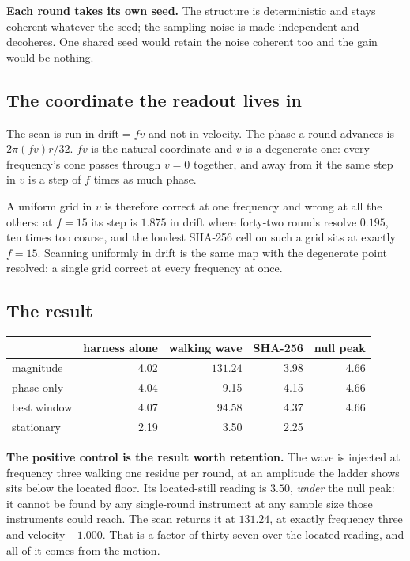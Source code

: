 \textbf{Each round takes its own seed.} The structure is deterministic and stays coherent whatever
the seed; the sampling noise is made independent and decoheres. One shared seed would retain the
noise coherent too and the gain would be nothing.

\subsection{The coordinate the readout lives in}

The scan is run in \(\text{drift} = f v\) and not in velocity. The phase a round advances is
\(2 \pi (f v) r / 32\). \(fv\) is the natural coordinate and \(v\) is a degenerate one: every
frequency's cone passes through \(v = 0\) together, and away from it the same step in \(v\) is a
step of \(f\) times as much phase.

A uniform grid in \(v\) is therefore correct at one frequency and wrong at all the others: at
\(f = 15\) its step is \(1.875\) in drift where forty-two rounds resolve \(0.195\), ten times too
coarse, and the loudest SHA-256 cell on such a grid sits at exactly \(f = 15\). Scanning uniformly
in drift is the same map with the degenerate point resolved: a single grid correct at every
frequency at once.

\subsection{The result}

\begin{center}
\begin{tabular}{lrrrr}
\toprule
 & harness alone & walking wave & SHA-256 & null peak \\
\midrule
magnitude & 4.02 & \(\mathbf{131.24}\) & 3.98 & 4.66 \\
phase only & 4.04 & 9.15 & 4.15 & 4.66 \\
best window & 4.07 & 94.58 & 4.37 & 4.66 \\
stationary & 2.19 & 3.50 & 2.25 & \textemdash{} \\
\bottomrule
\end{tabular}
\end{center}

\textbf{The positive control is the result worth retention.} The wave is injected at frequency three
walking one residue per round, at an amplitude the ladder shows sits below the located floor. Its
located-still reading is \(3.50\), \emph{under} the null peak: it cannot be found by any
single-round instrument at any sample size those instruments could reach. The scan returns it at
\(131.24\), at exactly frequency three and velocity \(-1.000\). That is a factor of thirty-seven
over the located reading, and all of it comes from the motion.

